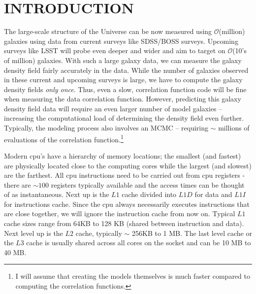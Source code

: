 \documentclass[preprint,authoryear,12pt]{elsarticle}
\begin{document}
\section{INTRODUCTION}
The large-scale structure of the Universe can be now measured using $\mathcal{O}$(million) galaxies 
using data from current surveys like SDSS/BOSS surveys. Upcoming surveys like LSST will probe even 
deeper and wider and aim to target on $\mathcal{O}$(10's of million) galaxies. With such a large galaxy data, 
we can measure the galaxy density field fairly accurately in the data. While the number of galaxies observed 
in these current and upcoming surveys is large, we have to compute the galaxy density fields {\em only once}. Thus, 
even a slow, correlation function code will be fine when measuring the data correlation function. 
However, predicting this galaxy  density field data will require an even larger number of model galaxies -- increasing the computational 
load of determining the density field even further. Typically, the modeling process also involves an MCMC -- 
requiring $\sim$ millions of evaluations of the correlation function.\footnote{I will assume that creating the models themselves 
is much faster compared to computing the correlation functions.} 

Modern cpu's have a hierarchy of memory locations; the smallest (and fastest) are physically located close to the computing cores 
while the largest (and slowest) are the farthest. All cpu instructions need to be carried out from cpu registers - there are $\sim 100$ 
registers typically available and the 
access times can be thought of as instantaneous. Next up is the $L1$ cache divided into $L1D$ for data and $L1I$ for instructions cache. Since 
the cpu always necessarily executes instructions that are close together, we will ignore the instruction cache from now on. Typical $L1$ cache 
sizes range from 64KB to 128 KB (shared between instruction and data). 
Next level up is the $L2$ cache, typically $\sim$ 256KB to 1 MB. The last level cache or the $L3$ cache is usually shared across all 
cores on the socket and can be 10 MB to 40 MB. 
\end{document}
